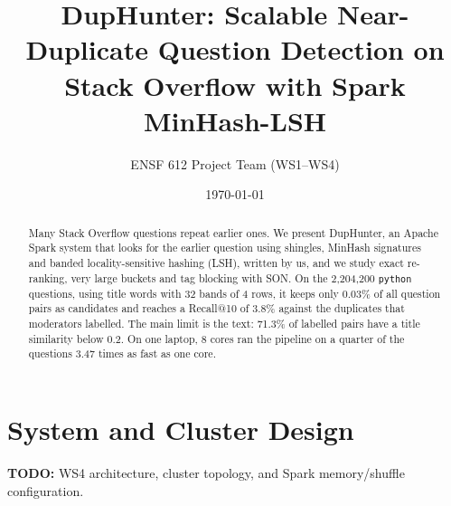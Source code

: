 \documentclass[11pt,twocolumn]{article}
\title{DupHunter: Scalable Near-Duplicate Question Detection on Stack Overflow with Spark MinHash-LSH}
\author{ENSF 612 Project Team (WS1--WS4)}
\date{\today}
\begin{document}
\maketitle

\begin{abstract}
Many Stack Overflow questions repeat earlier ones. We present DupHunter, an Apache Spark system that
looks for the earlier question using shingles, MinHash signatures and banded locality-sensitive
hashing (LSH), written by us, and we study exact re-ranking, very large buckets and tag blocking with
SON. On the 2,204,200 \texttt{python} questions, using title words with 32 bands of 4 rows, it
keeps only 0.03\% of all question pairs as candidates and reaches a Recall@10 of 3.8\% against the duplicates
that moderators labelled. The main limit is the text: 71.3\% of labelled pairs have a title
similarity below 0.2. On one laptop, 8 cores ran the pipeline on a quarter of the questions 3.47
times as fast as one core.
\end{abstract}

\wsoneIntro

\wstwoRelated

\wsoneDataset

\wstwoMethodology
\ifdefined\wsthreeMethodology\wsthreeMethodology\fi

\section{System and Cluster Design}
\ifdefined\wsfourSystem\wsfourSystem\else
\textbf{TODO:} WS4 architecture, cluster topology, and Spark memory/shuffle configuration.
\fi

\wsoneDesign

\wstwoResults
\ifdefined\wsthreeResults\wsthreeResults\fi
\ifdefined\wsfourResults\wsfourResults\fi
\wsoneResults

\wstwoAnalysis
\ifdefined\wsthreeAnalysis\wsthreeAnalysis\fi
\ifdefined\wsfourAnalysis\wsfourAnalysis\fi
\wsoneAnalysis
\end{document}
